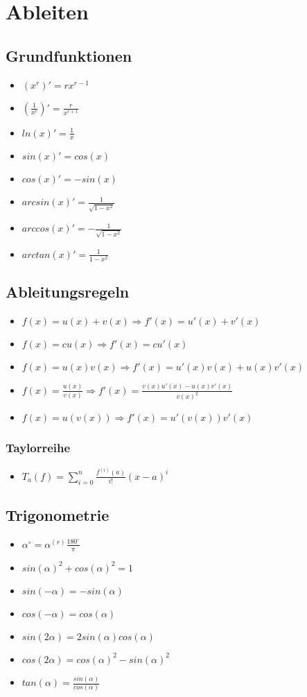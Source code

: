 \section{Ableiten}

\subsection{Grundfunktionen}
\begin{itemize}
	\item $(x^r)' = r x^{r-1}$
	\item $(\frac{1}{x^r})' = \frac{r}{x^{r+1}}$
	\item $ln(x)' = \frac{1}{x}$
	\item $sin(x)' = cos(x)$
	\item $cos(x)' = -sin(x)$
	\item $arcsin(x)' = \frac{1}{\sqrt{1-x^2}}$
	\item $arccos(x)' = - \frac{1}{\sqrt{1-x^2}}$
	\item $arctan(x)' = \frac{1}{1-x^2}$
\end{itemize}

\subsection{Ableitungsregeln}
\begin{itemize}
	\item $f(x) = u(x) + v(x) \Rightarrow f'(x) = u'(x) + v'(x)$
	\item $f(x) = c u(x) \Rightarrow f'(x) = c u'(x)$
	\item $f(x) = u(x) v(x) \Rightarrow f'(x) = u'(x) v(x) + u(x) v'(x)$
	\item $f(x) = \frac{u(x)}{v(x)} \Rightarrow f'(x) = \frac{v(x) u'(x) - u(x) v'(x)}{v(x)^2}$
	\item $f(x) = u(v(x)) \Rightarrow f'(x) = u'(v(x)) v'(x)$
\end{itemize}
\subsubsection{Taylorreihe}
\begin{itemize}
	\item $T_a(f) = \sum_{i=0}^n \frac{f^{(i)}(a)}{i!}(x-a)^i$
\end{itemize}

\subsection{Trigonometrie}
\begin{itemize}
	\item $\alpha^\circ = \alpha^{(r)} \frac{180^\circ}{\pi}$
	\item $sin(\alpha)^2 + cos(\alpha)^2 = 1$
	\item $sin(-\alpha) = - sin(\alpha)$
	\item $cos(-\alpha) = cos(\alpha)$
	\item $sin(2\alpha) = 2 sin(\alpha) cos(\alpha)$
	\item $cos(2\alpha) = cos(\alpha)^2 - sin(\alpha)^2$
	\item $tan(\alpha) = \frac{sin(\alpha)}{cos(\alpha)}$
\end{itemize}

